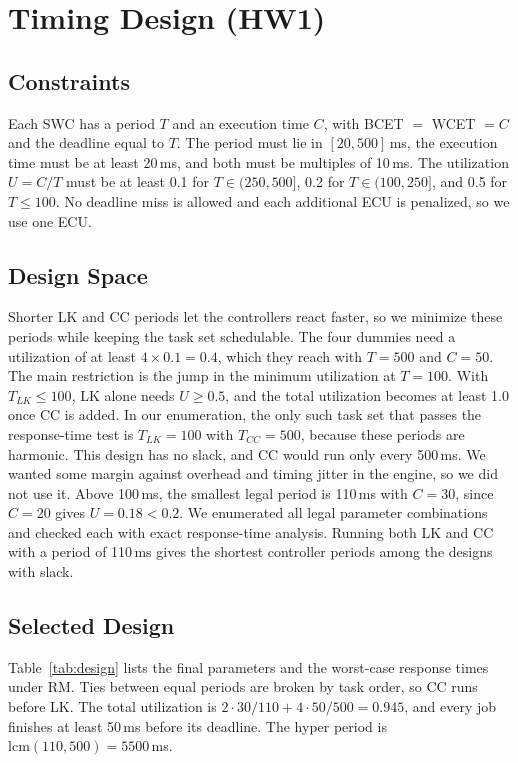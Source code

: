 \documentclass[11pt,a4paper]{article}
\begin{document}
\section{Timing Design (HW1)}
\subsection{Constraints}
Each SWC has a period $T$ and an execution time $C$, with BCET $=$ WCET $= C$ and the deadline equal
to $T$. The period must lie in $[20, 500]$\,ms, the execution time must be at least 20\,ms, and both
must be multiples of 10\,ms. The utilization $U = C/T$ must be at least 0.1 for $T \in (250,500]$, 0.2 for
$T \in (100,250]$, and 0.5 for $T \le 100$. No deadline miss is allowed and
each additional ECU is penalized, so we use one ECU.

\subsection{Design Space}
Shorter LK and CC periods let the controllers react faster, so we minimize these periods while
keeping the task set schedulable. The four dummies need a utilization of at least $4 \times 0.1 = 0.4$,
which they reach with $T = 500$ and $C = 50$. The main restriction is the jump in the minimum
utilization at $T = 100$. With $T_{LK} \le 100$, LK alone needs $U \ge 0.5$, and the total utilization
becomes at least 1.0 once CC is added. In our enumeration, the only such task set that passes the
response-time test is $T_{LK} = 100$ with $T_{CC} = 500$, because these periods are harmonic. This
design has no slack, and CC would run only every 500\,ms. We wanted some margin against overhead and
timing jitter in the engine, so we did not use it. Above 100\,ms, the smallest legal period is 110\,ms
with $C = 30$, since $C = 20$ gives $U = 0.18 < 0.2$. We enumerated all legal parameter combinations
and checked each with exact response-time analysis. Running both LK and CC with a period of 110\,ms
gives the shortest controller periods among the designs with slack.

\subsection{Selected Design}
Table~\ref{tab:design} lists the final parameters and the worst-case response times under RM. Ties
between equal periods are broken by task order, so CC runs before LK. The total utilization is
$2 \cdot 30/110 + 4 \cdot 50/500 = 0.945$, and every job finishes at least 50\,ms before its
deadline. The hyper period is $\mathrm{lcm}(110, 500) = 5500$\,ms.
\end{document}
